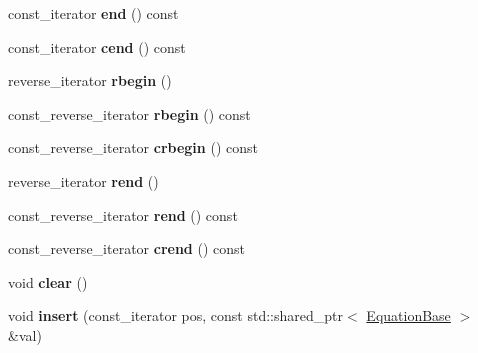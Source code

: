 \begin{DoxyCompactItemize}
\mbox{\label{classradix_1_1Equation_a3bc3acdc2cc562af75486cb27128e891}} 
const\+\_\+iterator {\bfseries end} () const
\item 
\mbox{\label{classradix_1_1Equation_a853a4cbb48e60e58d55f0f1e6bca607b}} 
const\+\_\+iterator {\bfseries cend} () const
\item 
\mbox{\label{classradix_1_1Equation_a424dc6c48c89e153c9f298e28f42b2c7}} 
reverse\+\_\+iterator {\bfseries rbegin} ()
\item 
\mbox{\label{classradix_1_1Equation_a4ed8311ef1a74bedf12cecb59a74c94e}} 
const\+\_\+reverse\+\_\+iterator {\bfseries rbegin} () const
\item 
\mbox{\label{classradix_1_1Equation_a3ea3b6c4b675fc243a09e703cacdb68d}} 
const\+\_\+reverse\+\_\+iterator {\bfseries crbegin} () const
\item 
\mbox{\label{classradix_1_1Equation_a59bbd6b42ff166f0624dc922dbeaad95}} 
reverse\+\_\+iterator {\bfseries rend} ()
\item 
\mbox{\label{classradix_1_1Equation_a405c72740924311f647b9f45e30b40c7}} 
const\+\_\+reverse\+\_\+iterator {\bfseries rend} () const
\item 
\mbox{\label{classradix_1_1Equation_a94ab3f3fda0dc831b0805af67ec97604}} 
const\+\_\+reverse\+\_\+iterator {\bfseries crend} () const
\item 
\mbox{\label{classradix_1_1Equation_ad54cf2410ccc309578327da863f8845c}} 
void {\bfseries clear} ()
\item 
\mbox{\label{classradix_1_1Equation_a32363cf88af0d74043904d4c67d0f358}} 
void {\bfseries insert} (const\+\_\+iterator pos, const std\+::shared\+\_\+ptr$<$ \hyperlink{classradix_1_1EquationBase}{Equation\+Base} $>$ \&val)
\item 
\mbox{\label{classradix_1_1Equation_a897f1dc523e017bf5d01d5f0db3cb7c5}} 

\end{DoxyCompactItemize}
